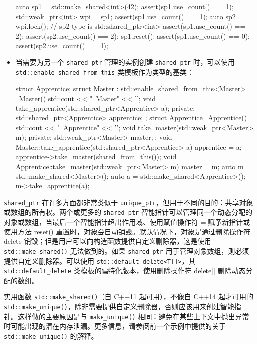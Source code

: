 \begin{itemize}
\begin{cpp}
auto sp1 = std::make_shared<int>(42);
assert(sp1.use_count() == 1);
std::weak_ptr<int> wpi = sp1;
assert(sp1.use_count() == 1);
auto sp2 = wpi.lock(); // sp2 type is std::shared_ptr<int>
assert(sp1.use_count() == 2);
assert(sp2.use_count() == 2);
sp1.reset();
assert(sp1.use_count() == 0);
assert(sp2.use_count() == 1);
\end{cpp}

\item
当需要为另一个 \verb|shared_ptr| 管理的实例创建 \verb|shared_ptr| 时，可以使用 \verb|std::enable_shared_from_this| 类模板作为类型的基类：

\begin{cpp}
struct Apprentice;
struct Master : std::enable_shared_from_this<Master>
{
    ~Master() { std::cout << "~Master" << '\n'; }
    void take_apprentice(std::shared_ptr<Apprentice> a);
    private:
    std::shared_ptr<Apprentice> apprentice;
};
struct Apprentice
{
    ~Apprentice() { std::cout << "~Apprentice" << '\n'; }
    void take_master(std::weak_ptr<Master> m);
    private:
    std::weak_ptr<Master> master;
};
void Master::take_apprentice(std::shared_ptr<Apprentice> a)
{
    apprentice = a;
    apprentice->take_master(shared_from_this());
}
void Apprentice::take_master(std::weak_ptr<Master> m)
{
    master = m;
}
auto m = std::make_shared<Master>();
auto a = std::make_shared<Apprentice>();
m->take_apprentice(a);
\end{cpp}
\end{itemize}


\verb|shared_ptr| 在许多方面都非常类似于 \verb|unique_ptr|，但用于不同的目的：共享对象或数组的所有权。两个或更多的 \verb|shared_ptr| 智能指针可以管理同一个动态分配的对象或数组，当最后一个智能指针超出作用域、使用赋值操作符 = 赋予新指针或使用方法 reset() 重置时，对象会自动销毁。默认情况下，对象是通过删除操作符 delete 销毁；但是用户可以向构造函数提供自定义删除器，这是使用 \verb|std::make_shared()| 无法做到的。如果 \verb|shared_ptr| 用于管理对象数组，则必须提供自定义删除器。可以使用 \verb|std::default_delete<T[]>|，其 \verb|std::default_delete| 类模板的偏特化版本，使用删除操作符 delete[] 删除动态分配的数组。

实用函数 \verb|std::make_shared()|（自 C++11 起可用），不像自 C++14 起才可用的 \verb|std::make_unique()|，除非需要提供自定义删除器，否则应该用来创建智能指针。这样做的主要原因是与 \verb|make_unique()| 相同：避免在某些上下文中抛出异常时可能出现的潜在内存泄漏。更多信息，请参阅前一个示例中提供的关于 \verb|std::make_unique()| 的解释。

